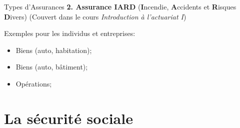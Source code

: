 \documentclass[10pt, french]{article}
\begin{document}
\begin{multicols*}{3}
\begin{conceptgen}{Types d'Assurances}
\textbf{2. Assurance IARD} (\textbf{I}ncendie, \textbf{A}ccidents et \textbf{R}isques \textbf{D}ivers)  \textcolor{amaranth}{(Couvert dans le cours \textit{Introduction à l'actuariat I})}  

Exemples pour les \textcolor{amethyst}{individus} et \textcolor{amaranth}{entreprises}:
\begin{itemize}[leftmargin = *]
	\item	\textcolor{amethyst}{Biens (auto, habitation)};
	\item	\textcolor{amaranth}{Biens (auto, bâtiment)};
	\item	\textcolor{amaranth}{Opérations};
\end{itemize}
\end{conceptgen}


\section{La sécurité sociale}

\end{multicols*}
\end{document}
